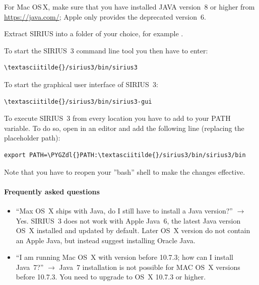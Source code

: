 \documentclass[letterpaper,10pt,openany,oneside]{sphinxmanual}
\def\PYGZdl{\char`\$}
\begin{document}
For Mac OS\,X, make sure that you have installed JAVA version~8 or higher
from \url{https://java.com/}; Apple only provides the deprecated version~6.

Extract SIRIUS into a folder of your choice, for example .

To start the SIRIUS~3 command line tool you then have to enter:
\begin{Verbatim}[commandchars=\\\{\}]
\textasciitilde{}/sirius3/bin/sirius3
\end{Verbatim}

To start the graphical user interface of SIRIUS~3:
\begin{Verbatim}[commandchars=\\\{\}]
\textasciitilde{}/sirius3/bin/sirius3-gui
\end{Verbatim}

To execute SIRIUS~3 from every location you have to add 
to your PATH variable. To do so, open  in an 
editor and add the following line (replacing the placeholder path):
\begin{Verbatim}[commandchars=\\\{\}]
export PATH=\PYGZdl{}PATH:\textasciitilde{}/sirius3/bin/sirius3/bin
\end{Verbatim}
Note that you have to reopen your ''bash'' shell to make the changes effective.


\paragraph{Frequently asked questions}

\begin{itemize}
\item ``Max OS~X ships with Java, do I still have to install a Java
  version?''  $\to$ Yes. SIRIUS~3 does not work with Apple Java~6, the latest
  Java version OS~X installed and updated by default. Later OS~X version do
  not contain an Apple Java, but instead suggest installing Oracle Java.

\item ``I am running Mac OS~X with version before 10.7.3; how can I install
  Java~7?'' $\to$ Java~7 installation is not possible for MAC OS~X versions
  before 10.7.3. You need to upgrade to OS~X 10.7.3 or higher.
\end{itemize}


\end{document}
